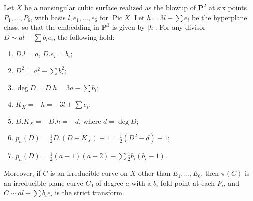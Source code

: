 Let $X$ be a nonsingular cubic surface realized as the blowup of $\mathbf{P}^2$ at six points $P_1, \ldots, P_6$, with basis $l, e_1, \ldots, e_6$ for $\operatorname{Pic} X$. Let $h = 3l - \sum e_i$ be the hyperplane class, so that the embedding in $\mathbf{P}^3$ is given by $|h|$. For any divisor $D \sim al - \sum b_i e_i$, the following hold:
\begin{enumerate}
\item[(a)] $D.l = a$, $D.e_i = b_i$;
\item[(b)] $D^2 = a^2 - \sum b_i^2$;
\item[(c)] $\deg D = D.h = 3a - \sum b_i$;
\item[(d)] $K_X = -h = -3l + \sum e_i$;
\item[(e)] $D.K_X = -D.h = -d$, where $d = \deg D$;
\item[(f)] $p_a(D) = \frac{1}{2}D.(D + K_X) + 1 = \frac{1}{2}(D^2 - d) + 1$;
\item[(g)] $p_a(D) = \frac{1}{2}(a - 1)(a - 2) - \sum \frac{1}{2}b_i(b_i - 1)$.
\end{enumerate}
Moreover, if $C$ is an irreducible curve on $X$ other than $E_1, \ldots, E_6$, then $\pi(C)$ is an irreducible plane curve $C_0$ of degree $a$ with a $b_i$-fold point at each $P_i$, and $C \sim al - \sum b_i e_i$ is the strict transform.
